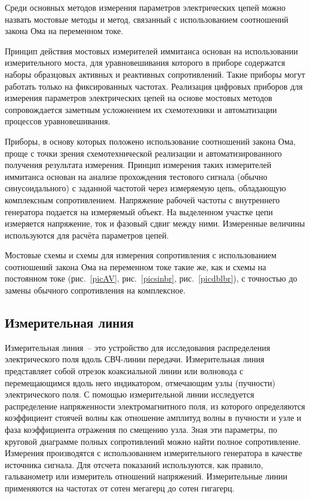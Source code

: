 \documentclass[pscyr,titlepage]{hedreport}
\newcommand{\Pic}[1]{\ref{pic#1}}
\newcommand{\pic}[1]{рис.~\Pic{#1}}
\begin{document}
  Среди основных методов измерения параметров электрических цепей можно назвать
  мостовые методы и метод, связанный с использованием соотношений закона Ома на
  переменном токе.
  
  Принцип действия мостовых измерителей иммитанса основан на использовании
  измерительного моста, для уравновешивания которого в приборе содержатся наборы
  образцовых активных и реактивных сопротивлений. Такие приборы могут работать
  только на фиксированных частотах. Реализация цифровых приборов для измерения
  параметров электрических цепей на основе мостовых методов сопровождается
  заметным усложнением их схемотехники и автоматизации процессов уравновешивания.
  
  Приборы, в основу которых положено использование соотношений закона Ома,
  проще с точки зрения схемотехнической реализации и автоматизированного
  получения результата измерения. Принцип измерения таких измерителей иммитанса
  основан на анализе прохождения тестового сигнала (обычно синусоидального) с
  заданной частотой через измеряемую цепь, обладающую комплексным
  сопротивлением. Напряжение рабочей частоты с внутреннего генератора подается
  на измеряемый объект. На выделенном участке цепи измеряется напряжение, ток и
  фазовый сдвиг между ними. Измеренные величины используются для расчёта
  параметров цепей.
  
  Мостовые схемы и схемы для измерения сопротивления с использованием
  соотношений закона Ома на переменном токе такие же, как и схемы на постоянном
  токе (\pic{AV}, \pic{sinbr}, \pic{dblbr}), с точностью до замены обычного
  сопротивления на комплексное.
  
  \subsection{Измерительная линия}

  Измерительная линия~-- это устройство для исследования распределения
  электрического поля вдоль СВЧ-линии передачи. Измерительная линия представляет
  собой отрезок коаксиальной линии или волновода с перемещающимся вдоль него
  индикатором, отмечающим узлы (пучности) электрического поля. С помощью
  измерительной линии исследуется распределение напряженности электромагнитного
  поля, из которого определяются коэффициент стоячей волны как отношение
  амплитуд волны в пучности и узле и фаза коэффициента отражения по смещению
  узла. Зная эти параметры, по круговой диаграмме полных сопротивлений можно
  найти полное сопротивление. Измерения производятся с использованием
  измерительного генератора в качестве источника сигнала. Для отсчета показаний
  используются, как правило, гальванометр или измеритель отношений напряжений.
  Измерительные линии применяются на частотах от сотен мегагерц до сотен
  гигагерц.
\end{document}
